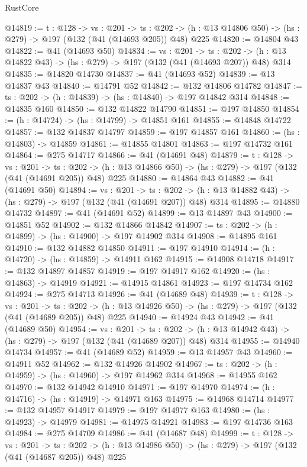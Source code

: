 \begin{lexlean}{RustCore}
\begin{coremodule}
@14819 := {t : @128} ->
  {vs : @201} ->
  {ts : @202} -> (h : @13 @14806 @50) -> (hs : @279) -> @197 (@132 (@41 (@14693 @205)) @48) @225
@14820 := @14804 @43
@14822 := @41 (@14693 @50)
@14834 := {vs : @201} ->
  {ts : @202} -> (h : @13 @14822 @43) -> (hs : @279) -> @197 (@132 (@41 (@14693 @207)) @48) @314
@14835 := @14820 @14730
@14837 := @41 (@14693 @52)
@14839 := @13 @14837 @43
@14840 := @14791 @52
@14842 := @132 @14806 @14782
@14847 := {ts : @202} -> (h : @14839) -> (hs : @14840) -> @197 @14842 @314
@14848 := @14835 @160
@14850 := @132 @14822 @14790
@14851 := @197 @14850
@14854 := (h : @14724) -> (hs : @14799) -> @14851 @161
@14855 := @14848 @14722
@14857 := @132 @14837 @14797
@14859 := @197 @14857 @161
@14860 := (hs : @14803) -> @14859
@14861 := @14855 @14801
@14863 := @197 @14732 @161
@14864 := @275 @14717
@14866 := @41 (@14691 @48)
@14879 := {t : @128} ->
  {vs : @201} ->
  {ts : @202} -> (h : @13 @14866 @50) -> (hs : @279) -> @197 (@132 (@41 (@14691 @205)) @48) @225
@14880 := @14864 @43
@14882 := @41 (@14691 @50)
@14894 := {vs : @201} ->
  {ts : @202} -> (h : @13 @14882 @43) -> (hs : @279) -> @197 (@132 (@41 (@14691 @207)) @48) @314
@14895 := @14880 @14732
@14897 := @41 (@14691 @52)
@14899 := @13 @14897 @43
@14900 := @14851 @52
@14902 := @132 @14866 @14842
@14907 := {ts : @202} -> (h : @14899) -> (hs : @14900) -> @197 @14902 @314
@14908 := @14895 @161
@14910 := @132 @14882 @14850
@14911 := @197 @14910
@14914 := (h : @14720) -> (hs : @14859) -> @14911 @162
@14915 := @14908 @14718
@14917 := @132 @14897 @14857
@14919 := @197 @14917 @162
@14920 := (hs : @14863) -> @14919
@14921 := @14915 @14861
@14923 := @197 @14734 @162
@14924 := @275 @14713
@14926 := @41 (@14689 @48)
@14939 := {t : @128} ->
  {vs : @201} ->
  {ts : @202} -> (h : @13 @14926 @50) -> (hs : @279) -> @197 (@132 (@41 (@14689 @205)) @48) @225
@14940 := @14924 @43
@14942 := @41 (@14689 @50)
@14954 := {vs : @201} ->
  {ts : @202} -> (h : @13 @14942 @43) -> (hs : @279) -> @197 (@132 (@41 (@14689 @207)) @48) @314
@14955 := @14940 @14734
@14957 := @41 (@14689 @52)
@14959 := @13 @14957 @43
@14960 := @14911 @52
@14962 := @132 @14926 @14902
@14967 := {ts : @202} -> (h : @14959) -> (hs : @14960) -> @197 @14962 @314
@14968 := @14955 @162
@14970 := @132 @14942 @14910
@14971 := @197 @14970
@14974 := (h : @14716) -> (hs : @14919) -> @14971 @163
@14975 := @14968 @14714
@14977 := @132 @14957 @14917
@14979 := @197 @14977 @163
@14980 := (hs : @14923) -> @14979
@14981 := @14975 @14921
@14983 := @197 @14736 @163
@14984 := @275 @14709
@14986 := @41 (@14687 @48)
@14999 := {t : @128} ->
  {vs : @201} ->
  {ts : @202} -> (h : @13 @14986 @50) -> (hs : @279) -> @197 (@132 (@41 (@14687 @205)) @48) @225

\end{coremodule}
\end{lexlean}
